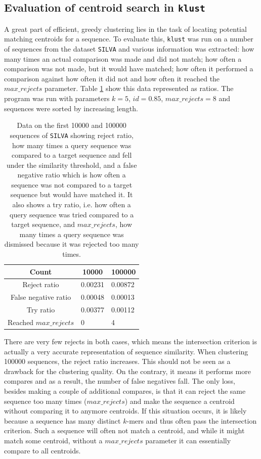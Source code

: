 \subsection{Evaluation of centroid search in \texttt{klust}}
\label{sec:evaluation_centroid_search}

A great part of efficient, greedy clustering lies in the task of locating
potential matching centroids for a sequence. To evaluate this, \texttt{klust}
was run on a number of sequences from the dataset \texttt{SILVA} and various
information was extracted: how many times an actual comparison was made and
did not match; how often a comparison was not made, but it would have matched;
how often it performed a comparison against how often it did not and how often
it reached the $max\_rejects$ parameter. Table \ref{tab:centroid_search_data}
show this data represented as ratios. The program was run with parameters
$k=5$, $id=0.85$, $max\_rejects=8$ and sequences were sorted by increasing length.

\begin{table}[H]
  \centering
  \begin{tabular}{c||l|l}
  Count                 & \multicolumn{1}{c|}{\num{10000}} & \multicolumn{1}{c}{\num{100000}} \\
  \hline\hline
  Reject ratio          & 0.00231  & 0.00872 \\
  \hline
  False negative ratio  & 0.00048  & 0.00013 \\
  \hline
  Try ratio             & 0.00377  & 0.00112 \\
  \hline
  Reached $max\_rejects$ & 0           & 4 \\
  \end{tabular}
  \caption{Data on the first \num{10000} and \num{100000} sequences of
  \texttt{SILVA} showing reject ratio, how many times a query sequence was
  compared to a target sequence and fell under the similarity threshold, and
  a false negative ratio which is how often a sequence was not compared to a
  target sequence but would have matched it. It also shows a try ratio, i.e. how
  often a query sequence was tried compared to a target sequence, and $max\_rejects$, how many
  times a query sequence was dismissed because it was rejected too many times.}
  \label{tab:centroid_search_data}
\end{table}

There are very few rejects in both cases, which means the intersection
criterion is actually a very accurate representation of sequence similarity.
When clustering \num{100000} sequences, the reject ratio increases. This
should not be seen as a drawback for the clustering quality. On the contrary,
it means it performs more compares and as a result, the number of false
negatives fall. The only loss, besides making a couple of additional compares,
is that it can reject the same sequence too many times ($max\_rejects$) and
make the sequence a centroid without comparing it to anymore centroids. If
this situation occurs, it is likely because a sequence has many distinct
$k$-mers and thus often pass the intersection criterion. Such a sequence will
often not match a centroid, and while it might match some centroid, without a
$max\_rejects$ parameter it can essentially compare to all centroids.

